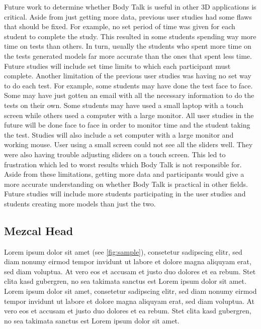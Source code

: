 \documentclass[journal]{vgtc}                %
\begin{document}
\noindent Future work to determine whether Body Talk is useful in other 3D applications is critical. Aside from just getting more data, previous user studies had some flaws that should be fixed. 
\newline \newline
\noindent For example, no set period of time was given for each student to complete the study. This resulted in some students spending way more time on tests than others. In turn, usually the students who spent more time on the tests generated models far more accurate than the ones that spent less time. Future studies will include set time limits to which each participant must complete. 
\newline\newline
\noindent Another limitation of the previous user studies was having no set way to do each test. For example, some students may have done the test face to face. Some may have just gotten an email with all the necessary information to do the tests on their own. Some students may have used a small laptop with a touch screen while others used a computer with a large monitor. All user studies in the future will be done face to face in order to monitor time and the student taking the test. Studies will also include a set computer with a large monitor and working mouse. User using a small screen could not see all the sliders well. They were also having trouble adjusting sliders on a touch screen. This led to frustration which led to worst results which Body Talk is not responsible for. 
\newline\newline
\noindent Aside from these limitations, getting more data and participants would give a more accurate understanding on whether Body Talk is practical in other fields. Future studies will include more students participating in the user studies and students creating more models than just the two.  
  



\subsection{Mezcal Head}

Lorem ipsum dolor sit amet (see \autoref{fig:sample}), consetetur sadipscing elitr, sed diam
nonumy eirmod tempor invidunt ut labore et dolore magna aliquyam erat,
sed diam voluptua. At vero eos et accusam et justo duo dolores et ea
rebum. Stet clita kasd gubergren, no sea takimata sanctus est Lorem
ipsum dolor sit amet. Lorem ipsum dolor sit amet, consetetur
sadipscing elitr, sed diam nonumy eirmod tempor invidunt ut labore et
dolore magna aliquyam erat, sed diam voluptua. At vero eos et accusam
et justo duo dolores et ea rebum. Stet clita kasd gubergren, no sea
takimata sanctus est Lorem ipsum dolor sit amet. 
\end{document}
